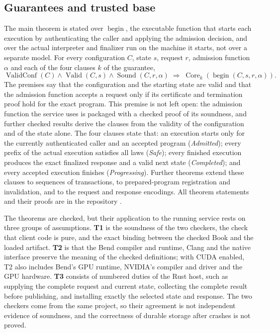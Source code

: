 \documentclass[12pt]{article}
\newcommand{\op}[1]{\operatorname{#1}}
\begin{document}
\subsection{Guarantees and trusted base}
The main theorem is stated over $\op{begin}$, the executable function that
starts each execution by authenticating the caller and applying the admission decision, and over the
actual interpreter and finalizer run on the machine it starts, not over a
separate model. For every configuration $C$, state $s$, request $r$, admission
function $\alpha$ and each of the four clauses $k$ of the guarantee,
\[
\op{ValidConf}(C)\wedge\op{Valid}(C,s)\wedge
\op{Sound}(C,r,\alpha)\;\Longrightarrow\;
\op{Core}_k(\op{begin}(C,s,r,\alpha)).
\]
The premises say that the configuration and the starting state are valid and
that the admission function accepts a request only if its certificate and
termination proof hold for the exact program. This premise is not left open: the admission function the service
uses is packaged with a checked proof of its soundness, and further checked results
derive the clauses from the validity of the configuration and
of the state alone. The four clauses state that: an execution starts only for the
currently authenticated caller and an accepted program (\emph{Admitted}); every
prefix of the actual execution satisfies all laws (\emph{Safe}); every finished
execution produces the exact finalized response and a valid next state
(\emph{Completed}); and every accepted execution finishes (\emph{Progressing}).
Further theorems extend these clauses to sequences of transactions, to
prepared-program registration and invalidation, and to the request and response
encodings. All theorem statements and their proofs are in the repository
\cite{artifact}.

The theorems are checked, but their application to the running service rests on
three groups of assumptions. \textbf{T1} is the soundness of the two checkers, the
check that client code is pure, and the exact binding between the checked Book
and the loaded artifact.
\textbf{T2} is that the Bend compiler and runtime, Clang and the native interface
preserve the meaning of the checked definitions; with CUDA enabled, T2 also
includes Bend's GPU runtime, NVIDIA's compiler and driver and the GPU hardware.
\textbf{T3} consists of \HostDutyCount{} numbered duties of the Rust host, such as
supplying the complete request and current state, collecting the complete result
before publishing, and installing exactly the selected state and response. The
two checkers come from the same project, so their agreement is not independent
evidence of soundness, and the correctness of durable storage after crashes is not
proved.
\end{document}
